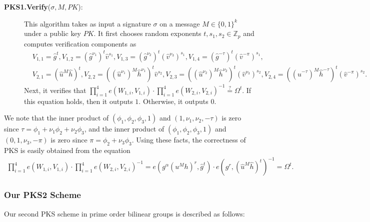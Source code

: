 \documentclass[11pt,letterpaper]{article}
\newcommand{\Z}{\mathbb{Z}}
\newcommand{\bits}{\{0,1\}}
\begin{document}
\begin{description}
\item [\textbf{PKS1.Verify}($\sigma, M, PK$):] This algorithm takes as
    input a signature $\sigma$ on a message $M \in \bits^k$ under a public
    key $PK$. It first chooses random exponents $t, s_1, s_2 \in \Z_p$ and
    computes verification components as
    \begin{align*}
    &   V_{1,1} = \hat{g}^t,
        V_{1,2} = (\hat{g}^{\nu_1})^t \hat{v}^{s_1},
        V_{1,3} = (\hat{g}^{\nu_2})^t (\hat{v}^{\nu_3})^{s_1},
        V_{1,4} = (\hat{g}^{-\tau})^t (\hat{v}^{-\pi})^{s_1}, \\
    &   V_{2,1} = (\hat{u}^M \hat{h})^t,
        V_{2,2} = ((\hat{u}^{\nu_1})^M \hat{h}^{\nu_1})^t \hat{v}^{s_2},
        V_{2,3} = ((\hat{u}^{\nu_2})^M \hat{h}^{\nu_2})^t (\hat{v}^{\nu_3})^{s_2},
        V_{2,4} = ((\hat{u}^{-\tau})^M \hat{h}^{-\tau})^t (\hat{v}^{-\pi})^{s_2}.
    \end{align*}
    Next, it verifies that $\prod_{i=1}^4 e(W_{1,i}, V_{1,i}) \cdot
    \prod_{i=1}^4 e(W_{2,i}, V_{2,i})^{-1} \stackrel{?}{=} \Omega^t$. If
    this equation holds, then it outputs $1$. Otherwise, it outputs $0$.
\end{description}

We note that the inner product of $(\phi_1, \phi_2, \phi_3, 1)$ and $(1,
\nu_1, \nu_2, -\tau)$ is zero since $\tau = \phi_1 + \nu_1 \phi_2 + \nu_2
\phi_3$, and the inner product of $(\phi_1, \phi_2, \phi_3, 1)$ and $(0, 1,
\nu_3, -\pi)$ is zero since $\pi = \phi_2 + \nu_3 \phi_3$. Using these facts,
the correctness of PKS is easily obtained from the equation
    \begin{align*}
    \prod_{i=1}^4 e(W_{1,i}, V_{1,i}) \cdot \prod_{i=1}^4 e(W_{2,i}, V_{2,i})^{-1}
        = e(g^{\alpha} (u^M h)^r, \hat{g}^t) \cdot
          e(g^r, (\hat{u}^M \hat{h})^t)^{-1}
        = \Omega^t.
    \end{align*}

\subsubsection{Our PKS2 Scheme}

Our second PKS scheme in prime order bilinear groups is described as follows:
\end{document}
